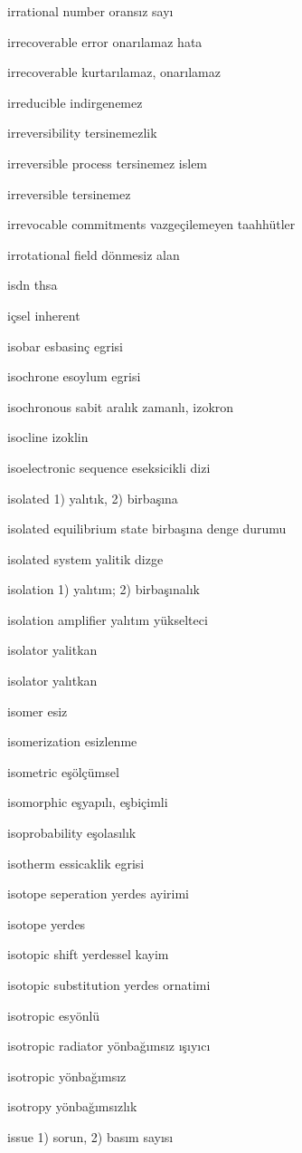 \documentclass[12pt,fleqn]{article}\usepackage{../../common}
\begin{document}
irrational number oransız sayı

irrecoverable error onarılamaz hata

irrecoverable kurtarılamaz, onarılamaz

irreducible indirgenemez

irreversibility tersinemezlik

irreversible process tersinemez islem

irreversible tersinemez

irrevocable commitments vazgeçilemeyen taahhütler

irrotational field dönmesiz alan

isdn thsa

içsel inherent

isobar esbasinç egrisi

isochrone esoylum egrisi

isochronous sabit aralık zamanlı, izokron

isocline izoklin

isoelectronic sequence eseksicikli dizi

isolated 1) yalıtık, 2) birbaşına

isolated equilibrium state birbaşına denge durumu

isolated system yalitik dizge

isolation 1) yalıtım; 2) birbaşınalık

isolation amplifier yalıtım yükselteci

isolator yalitkan

isolator yalıtkan

isomer esiz

isomerization esizlenme

isometric eşölçümsel

isomorphic eşyapılı, eşbiçimli

isoprobability eşolasılık

isotherm essicaklik egrisi

isotope seperation yerdes ayirimi

isotope yerdes

isotopic shift yerdessel kayim

isotopic substitution yerdes ornatimi

isotropic esyönlü

isotropic radiator yönbağımsız ışıyıcı

isotropic yönbağımsız

isotropy yönbağımsızlık

issue 1) sorun, 2) basım sayısı
\end{document}
